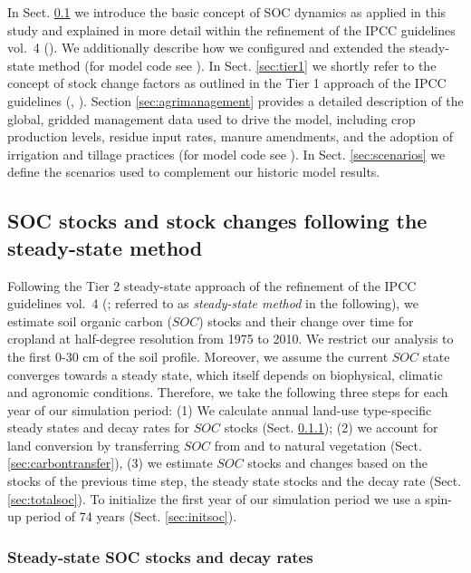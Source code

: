 \documentclass[gc, manuscript]{copernicus}
\begin{document}
In Sect. \ref{sec:carbonbudget} we introduce the basic concept of SOC dynamics as applied in this study and explained in more detail within the refinement of the IPCC guidelines vol.~4 (\citep{calvo_buendia_ipcc_2019}). We additionally describe how we configured and extended the steady-state method (for model code see \citep{karstens_mrsoil_2020}). In Sect. \ref{sec:tier1} we shortly refer to the concept of stock change factors as outlined in the Tier 1 approach of the IPCC guidelines (\citep{eggleston_ipcc_2006}, \citep{calvo_buendia_ipcc_2019}).
Section \ref{sec:agrimanagement} provides a detailed description of the global, gridded management data used to drive the model, including crop production levels, residue input rates, manure amendments, and the adoption of irrigation and tillage practices (for model code see \citep{bodirsky_mrcommons_2020}). In Sect. \ref{sec:scenarios} we define the scenarios used to complement our historic model results.

\hypertarget{sec:carbonbudget}{%
\subsection{SOC stocks and stock changes following the steady-state method}\label{sec:carbonbudget}}

Following the Tier 2 steady-state approach of the refinement of the IPCC guidelines vol.~4 (\citep{calvo_buendia_ipcc_2019}; referred to as \textit{steady-state method} in the following), we estimate soil organic carbon (\(SOC\)) stocks and their change over time for cropland at half-degree resolution from 1975 to 2010. We restrict our analysis to the first 0-30 cm of the soil profile. Moreover, we assume the current \(SOC\) state converges towards a steady state, which itself depends on biophysical, climatic and agronomic conditions.
Therefore, we take the following three steps for each year of our simulation period:
(1) We calculate annual land-use type-specific steady states and decay rates for \(SOC\) stocks (Sect. \ref{sec:steadystates});
(2) we account for land conversion by transferring \(SOC\) from and to natural vegetation (Sect. \ref{sec:carbontransfer}),
(3) we estimate \(SOC\) stocks and changes based on the stocks of the previous time step, the steady state stocks and the decay rate (Sect. \ref{sec:totalsoc}).
To initialize the first year of our simulation period we use a spin-up period of 74 years (Sect. \ref{sec:initsoc}).

\hypertarget{sec:steadystates}{%
\subsubsection{Steady-state SOC stocks and decay rates}\label{sec:steadystates}}
\end{document}
